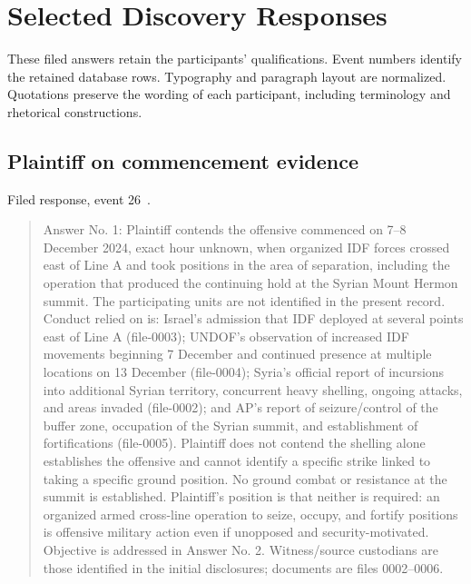 \section{Selected Discovery Responses}
These filed answers retain the participants' qualifications.  Event numbers identify the retained database rows.  Typography and paragraph layout are normalized.  Quotations preserve the wording of each participant, including terminology and rhetorical constructions.

\subsection{Plaintiff on commencement evidence}

Filed response, event 26~\cite{record}.

\begin{quote}
Answer No. 1: Plaintiff contends the offensive commenced on 7–8 December 2024, exact hour unknown, when organized IDF forces crossed east of Line A and took positions in the area of separation, including the operation that produced the continuing hold at the Syrian Mount Hermon summit. The participating units are not identified in the present record. Conduct relied on is: Israel's admission that IDF deployed at several points east of Line A (file-0003); UNDOF's observation of increased IDF movements beginning 7 December and continued presence at multiple locations on 13 December (file-0004); Syria's official report of incursions into additional Syrian territory, concurrent heavy shelling, ongoing attacks, and areas invaded (file-0002); and AP's report of seizure/control of the buffer zone, occupation of the Syrian summit, and establishment of fortifications (file-0005). Plaintiff does not contend the shelling alone establishes the offensive and cannot identify a specific strike linked to taking a specific ground position. No ground combat or resistance at the summit is established. Plaintiff's position is that neither is required: an organized armed cross-line operation to seize, occupy, and fortify positions is offensive military action even if unopposed and security-motivated. Objective is addressed in Answer No. 2. Witness/source custodians are those identified in the initial disclosures; documents are files 0002–0006.
\end{quote}

